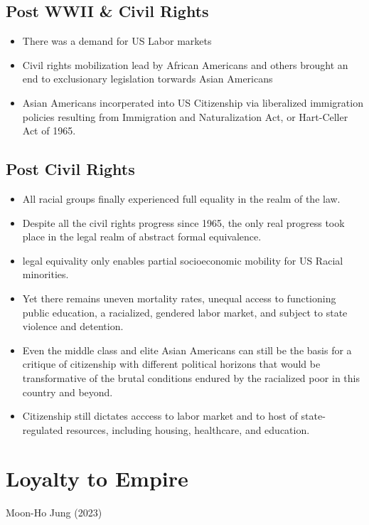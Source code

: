 \documentclass{article}
\begin{document}
\subsection{Post WWII \& Civil Rights}
\begin{itemize}
  \item There was a demand for US Labor markets
  \item Civil rights mobilization lead by African Americans
    and others brought an end to exclusionary legislation 
    torwards Asian Americans
  \item Asian Americans incorperated into US Citizenship via
    liberalized immigration policies resulting from 
    Immigration and Naturalization Act, or Hart-Celler Act of 1965.
\end{itemize}
\subsection{Post Civil Rights}
\begin{itemize}
  \item All racial groups finally experienced
    full equality in the realm of the law.
  \item Despite all the civil rights progress since 1965,
    the only real progress took place in the
    legal realm of abstract formal equivalence.
  \item legal equivality only enables partial
    socioeconomic mobility for US Racial minorities.
  \item Yet there remains uneven mortality rates,
    unequal access to functioning public education,
    a racialized, gendered labor market, and subject to
    state violence and detention.
  \item Even the middle class and elite Asian Americans
    can still be the basis for a critique of
    citizenship with different political horizons that would be
    transformative of the brutal conditions endured by the 
    racialized poor in this country and beyond.
  \item Citizenship still dictates acccess to labor market
    and to host of state-regulated resources, 
    including housing, healthcare, and education.
\end{itemize}


\pagebreak

\section{Loyalty to Empire}
Moon-Ho Jung (2023)
\end{document}
